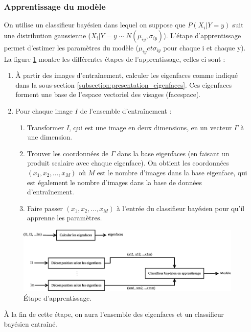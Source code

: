 \subsubsection{Apprentissage du modèle}
On utilise un classifieur bayésien dans lequel on suppose que $P(X_i|Y=y)$ suit une distribution
gaussienne ($X_i|Y=y \sim N(\mu_{iy}, \sigma_{iy})$).
L'étape d'apprentissage permet d'estimer les paramètres du modèle ($\mu_{iy} et
\sigma_{iy}$ pour chaque i et chaque y).
La figure \ref{fig:article:etapes_apprentissage} montre les différentes étapes
de l'apprentissage, celles-ci sont :
\begin{enumerate}
    \item À partir des images d’entraînement, calculer les eigenfaces
    comme indiqué dans la sous-section \ref{subsection:presentation_eigenfaces}.
    Ces eigenfaces forment une base de l'espace vectoriel des visages (facespace).
    \item Pour chaque image $I$ de l'ensemble d'entraînement :
    \begin{enumerate}
        \item Transformer $I$, qui est une image en deux dimensions, en un
        vecteur $\Gamma$ à une dimension.
        \item Trouver les coordonnées de $\Gamma$ dans la base eigenfaces
        (en faisant un produit scalaire avec chaque eigenface).
        On obtient les coordonnées $(x_1, x_2, ..., x_M)$ où $M$
        est le nombre d'images dans la base eigenface, qui est également le nombre d'images
        dans la base de données d'entraînement.
        \item Faire passer $(x_1, x_2, ..., x_M)$ à l'entrée du classifieur
        bayésien pour qu'il apprenne les paramètres.
    \end{enumerate}
\end{enumerate}
\begin{figure}[H]
    \centering
    \includegraphics[scale=0.4]{images/article_etapes_apprentissage}
    \caption{Étape d'apprentissage.}
    \label{fig:article:etapes_apprentissage}
\end{figure}
À la fin de cette étape, on aura l'ensemble des eigenfaces et un classifieur 
bayésien entraîné.

